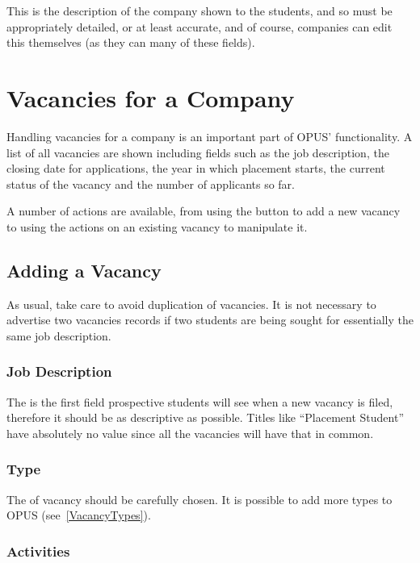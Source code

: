\documentclass[12 pt]{book}
\begin{document}
This is the description of the company shown to the students, and so must
be appropriately detailed, or at least accurate, and of course, companies can
edit this themselves (as they can many of these fields).

\section{Vacancies for a Company}

Handling vacancies for a company is an important part of OPUS' functionality.
A list of all vacancies are shown including fields such as the job description,
the closing date for applications, the year in which placement starts, the
current status of the vacancy and the number of applicants so far.

A number of actions are available, from using the  button to
add a new vacancy to using the actions on an existing vacancy to manipulate
it.

\subsection{Adding a Vacancy}

As usual, take care to avoid duplication of vacancies. It is not necessary to
advertise two vacancies records if two students are being sought for 
essentially the same job description.

\subsubsection{Job Description}

The  is the first field prospective students will
see when a new vacancy is filed, therefore it should be as descriptive as
possible. Titles like ``Placement Student'' have absolutely no value since all
the vacancies will have that in common.

\subsubsection{Type}

The  of vacancy should be carefully chosen. It is possible to
add more types to OPUS (see~\ref{VacancyTypes}).

\subsubsection{Activities}
\end{document}
